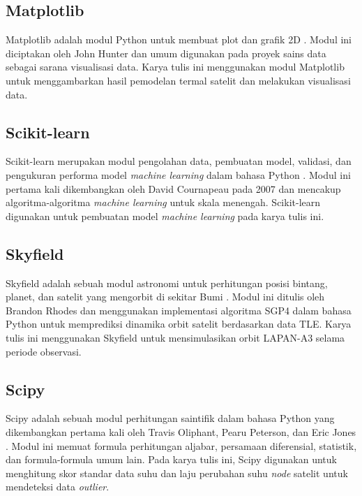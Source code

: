 \subsection{Matplotlib}

Matplotlib adalah modul Python untuk membuat plot dan grafik 2D
\cite{hunter2007}. Modul ini diciptakan oleh John Hunter dan umum digunakan
pada proyek sains data sebagai sarana visualisasi data. Karya tulis ini
menggunakan modul Matplotlib untuk menggambarkan hasil pemodelan termal
satelit dan melakukan visualisasi data.

\subsection{Scikit-learn}

Scikit-learn merupakan modul pengolahan data, pembuatan model, validasi, dan
pengukuran performa model \textit{machine learning} dalam bahasa Python
\cite{pedregosa2011}. Modul ini pertama kali dikembangkan oleh David Cournapeau
pada 2007 dan mencakup algoritma-algoritma \textit{machine learning} untuk
skala menengah. Scikit-learn digunakan untuk pembuatan model \textit{machine
learning} pada karya tulis ini.

\subsection{Skyfield}

Skyfield adalah sebuah modul astronomi untuk perhitungan posisi bintang,
planet, dan satelit yang mengorbit di sekitar Bumi \cite{rhodes2019}. Modul ini
ditulis oleh Brandon Rhodes dan menggunakan implementasi algoritma SGP4 dalam
bahasa Python \cite{rodriguez} untuk memprediksi dinamika orbit satelit
berdasarkan data TLE. Karya tulis ini menggunakan Skyfield untuk mensimulasikan
orbit LAPAN-A3 selama periode observasi.

\subsection{Scipy}

Scipy adalah sebuah modul perhitungan saintifik dalam bahasa Python yang
dikembangkan pertama kali oleh Travis Oliphant, Pearu Peterson, dan Eric Jones
\cite{virtanen2020}. Modul ini memuat formula perhitungan aljabar, persamaan
diferensial, statistik, dan formula-formula umum lain. Pada karya tulis ini,
Scipy digunakan untuk menghitung skor standar data suhu dan laju perubahan suhu
\textit{node} satelit untuk mendeteksi data \textit{outlier}.
